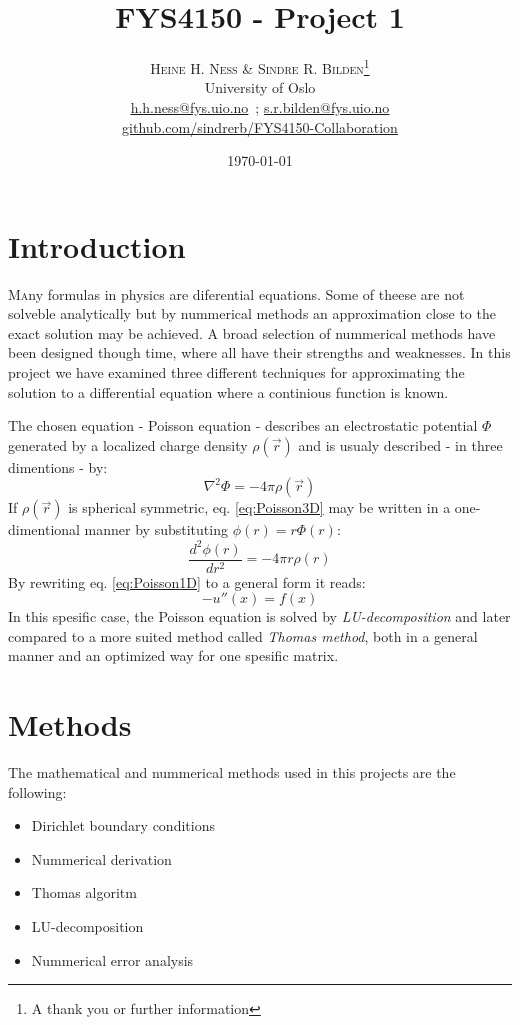 \documentclass[twoside,twocolumn]{article}
\title{FYS4150 - Project 1} %
\author{%
\textsc{Heine H. Ness \& Sindre R. Bilden}\thanks{A thank you or further information} \\[1ex] %
\normalsize University of Oslo \\ %
\normalsize \href{mailto:h.h.ness@fys.uio.no}{h.h.ness@fys.uio.no}\ ; \href{mailto:s.r.bilden@fys.uio.no}{s.r.bilden@fys.uio.no}\\%
\normalsize \href{https://github.com/sindrerb/FYS4150-Collaboration}{github.com/sindrerb/FYS4150-Collaboration}
}
\date{\today} %
\newcommand{\nl}{

\medskip
\noindent
}
\begin{document}
\maketitle


\section{Introduction}

\lettrine[nindent=0em,lines=3]{M}any formulas in physics are diferential equations. Some of theese are not solveble analytically but by nummerical methods an approximation close to the exact solution may be achieved. A broad selection of  nummerical methods have been designed though time, where all have their strengths and weaknesses.
In this project we have examined three different techniques for approximating the solution to a differential equation where a continious function is known.\nl 

The chosen equation - Poisson equation - describes an electrostatic potential $\Phi$ generated by a localized charge density $\rho(\vec{r})$ and is usualy described - in three dimentions - by:
\begin{equation}
\nabla^2\Phi = -4\pi \rho(\vec{r}) \label{eq:Poisson3D}
\end{equation}
If $\rho(\vec{r})$ is spherical symmetric, eq. \ref{eq:Poisson3D} may be written in a one-dimentional manner by substituting $\phi(r)=r\Phi(r)$:
\begin{equation}
\frac{d^2\phi(r)}{dr^2}=-4\pi r\rho(r) \label{eq:Poisson1D}
\end{equation}
By rewriting eq. \ref{eq:Poisson1D} to a general form it reads:
\begin{equation}
-u''(x)=f(x) \label{eq:general}
\end{equation}
In this spesific case, the Poisson equation is solved by \textit{LU-decomposition} and later compared to a more suited method called \textit{Thomas method}, both in a general manner and an optimized way for one spesific matrix.

\section{Methods}
The mathematical and nummerical methods used in this projects are the following:
\begin{itemize}
\item Dirichlet boundary conditions
\item Nummerical derivation
\item Thomas algoritm
\item LU-decomposition
\item Nummerical error analysis
\end{itemize}
\end{document}
